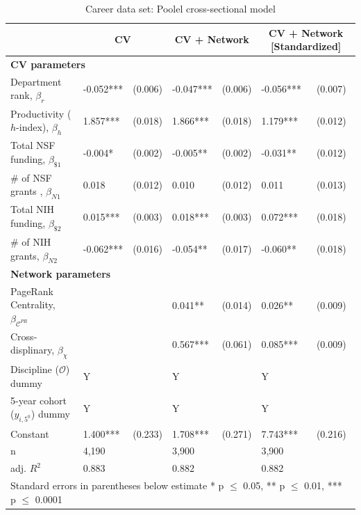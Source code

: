 \documentclass[10pt]{article}          %
\begin{document}
\begin{table}[H]
\caption{Career data set: Poolel cross-sectional model}
\begin{tabular}{m{5cm} m{1.5cm} m{1.5cm} m{1.5cm} m{1.5cm} p{1.5cm} p{1.5cm} }
\\
\hline
\hline
& \multicolumn{2}{c}{\textbf{CV}} & \multicolumn{2}{c}{\textbf{CV + Network}} & \multicolumn{2}{c}{\textbf{CV + Network [Standardized]}} \\ \hline
\multicolumn{7}{l}{\textbf{CV parameters}} \\
{Department rank, $\beta_r$}          & -0.052***  & (0.006) & -0.047***  & (0.006) & -0.056***   & (0.007) \\
{Productivity ($h$-index), $\beta_h$} & 1.857***   & (0.018) & 1.866***   & (0.018) & 1.179***    & (0.012) \\
{Total NSF funding, $\beta_{\$1}$}    & -0.004*    & (0.002) & -0.005**   & (0.002) & -0.031**    & (0.012) \\
{\# of NSF grants , $\beta_{N1}$}     & 0.018      & (0.012) & 0.010      & (0.012) & 0.011       & (0.013) \\
{Total NIH funding, $\beta_{\$2}$}    & 0.015***   & (0.003) & 0.018***   & (0.003) & 0.072***    & (0.018) \\
{\# of NIH grants, $\beta_{N2}$}      & -0.062***  & (0.016) & -0.054**   & (0.017) & -0.060**    & (0.018) \\ \hline

\multicolumn{7}{l}{\textbf{Network parameters}} \\
{PageRank Centrality, $\beta_{\mathscr{C}^{PR}}$}   &  &            & 0.041**     & (0.014) & 0.026**   & (0.009) \\
{Cross-displinary, $\beta_{\chi}$}       &  &            & 0.567***    & (0.061) & 0.085***  & (0.009) \\ \hline

{Discipline ($\mathscr{O}$) dummy}                & Y &  & Y &  & Y &  \\
{5-year cohort ($y_{i,5^0}$) dummy}   & Y &  & Y &  & Y & \\
{Constant}                            & 1.400*** & (0.233) & 1.708*** & (0.271) & 7.743*** & (0.216) \\ \hline

{n}                                   & 4,190 &  & 3,900 &  & 3,900 & \\
{adj. $R^2$}                          & 0.883 &  & 0.882 &  & 0.882 & \\ \hline \hline
\multicolumn{7}{l}{\footnotesize{Standard errors in parentheses below estimate * p $\leq$ 0.05, ** p $\leq$ 0.01, *** p $\leq$ 0.0001}}

\end{tabular}
\label{tbl:sT2}
\end{table}
\end{document}
